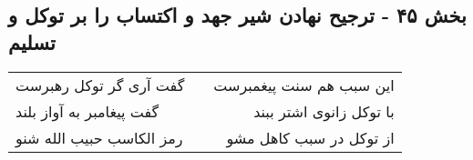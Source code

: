 \begin{center}
\section*{بخش ۴۵ - ترجیح نهادن شیر جهد و اکتساب را بر توکل و تسلیم}
\label{sec:sh045}
\begin{longtable}{l p{0.5cm} r}
گفت آری گر توکل رهبرست
&&
این سبب هم سنت پیغمبرست
\\
گفت پیغامبر به آواز بلند
&&
با توکل زانوی اشتر ببند
\\
رمز الکاسب حبیب الله شنو
&&
از توکل در سبب کاهل مشو
\\
\end{longtable}
\end{center}
